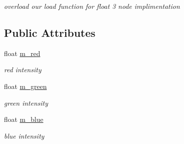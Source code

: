 \begin{DoxyCompactItemize}
\begin{DoxyCompactList}\small\item\em overload our load function for float 3 node implimentation \end{DoxyCompactList}\end{DoxyCompactItemize}
\subsection*{Public Attributes}
\begin{DoxyCompactItemize}
\item 
\hypertarget{class_color_node_proxy_widget_a8c47703e34c239ffb18833a3eb734fe6}{float \hyperlink{class_color_node_proxy_widget_a8c47703e34c239ffb18833a3eb734fe6}{m\-\_\-red}}\label{class_color_node_proxy_widget_a8c47703e34c239ffb18833a3eb734fe6}

\begin{DoxyCompactList}\small\item\em red intensity \end{DoxyCompactList}\item 
\hypertarget{class_color_node_proxy_widget_aa28cea0795b16ec5834e1b4aedc6100e}{float \hyperlink{class_color_node_proxy_widget_aa28cea0795b16ec5834e1b4aedc6100e}{m\-\_\-green}}\label{class_color_node_proxy_widget_aa28cea0795b16ec5834e1b4aedc6100e}

\begin{DoxyCompactList}\small\item\em green intensity \end{DoxyCompactList}\item 
\hypertarget{class_color_node_proxy_widget_a7d819513b88223e46a2740b9528cbd44}{float \hyperlink{class_color_node_proxy_widget_a7d819513b88223e46a2740b9528cbd44}{m\-\_\-blue}}\label{class_color_node_proxy_widget_a7d819513b88223e46a2740b9528cbd44}

\begin{DoxyCompactList}\small\item\em blue intensity \end{DoxyCompactList}\end{DoxyCompactItemize}

